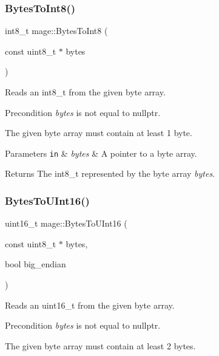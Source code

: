 \subsubsection{\texorpdfstring{Bytes\+To\+Int8()}{BytesToInt8()}}
{\footnotesize\ttfamily int8\+\_\+t mage\+::\+Bytes\+To\+Int8 (\begin{DoxyParamCaption}\item[{const uint8\+\_\+t $\ast$}]{bytes }\end{DoxyParamCaption})\hspace{0.3cm}{\ttfamily [noexcept]}}

Reads an int8\+\_\+t from the given byte array.

\begin{DoxyPrecond}{Precondition}
{\itshape bytes} is not equal to {\ttfamily nullptr}. 

The given byte array must contain at least 1 byte. 
\end{DoxyPrecond}

\begin{DoxyParams}[1]{Parameters}
\mbox{\tt in}  & {\em bytes} & A pointer to a byte array. \\
\hline
\end{DoxyParams}
\begin{DoxyReturn}{Returns}
The {\ttfamily int8\+\_\+t} represented by the byte array {\itshape bytes}. 
\end{DoxyReturn}
\hypertarget{namespacemage_a5d362d71af09a61b69a77650037528a9}{}\label{namespacemage_a5d362d71af09a61b69a77650037528a9} 
\subsubsection{\texorpdfstring{Bytes\+To\+U\+Int16()}{BytesToUInt16()}}
{\footnotesize\ttfamily uint16\+\_\+t mage\+::\+Bytes\+To\+U\+Int16 (\begin{DoxyParamCaption}\item[{const uint8\+\_\+t $\ast$}]{bytes,  }\item[{bool}]{big\+\_\+endian }\end{DoxyParamCaption})\hspace{0.3cm}{\ttfamily [noexcept]}}

Reads an uint16\+\_\+t from the given byte array.

\begin{DoxyPrecond}{Precondition}
{\itshape bytes} is not equal to {\ttfamily nullptr}. 

The given byte array must contain at least 2 bytes. 
\end{DoxyPrecond}

